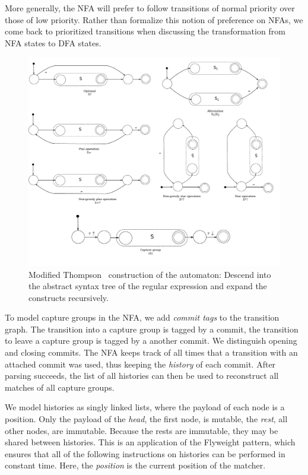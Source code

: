 \documentclass[11pt]{Thesis}
\theoremstyle{definition}
\begin{document}
More generally, the NFA will prefer to follow transitions of normal
priority over those of low priority. Rather than formalize this
notion of preference on NFAs, we come back to prioritized transitions when
discussing the transformation from NFA states to DFA states.

\begin{figure}[tb] \includegraphics[width=\linewidth]{graphs/thompson}
  \caption[Modified Thompson construction]{Modified Thompson~\cite{Thom68a} construction of the
automaton: Descend into the abstract syntax tree of the regular
expression and expand the constructs recursively.}
\label{fig:thompson-construction} 
\end{figure}

To model capture groups in the NFA, we add \emph{commit tags} to
the transition graph. The transition into a capture group is tagged
by a commit, the transition to leave a capture group is tagged by
a another commit. We distinguish opening and closing commits. The
NFA keeps track of all times that a transition with an attached
commit was used, thus keeping the \emph{history} of each commit.
After parsing succeeds, the list of all histories can then be used
to reconstruct all matches of all capture groups.

We model histories as singly linked lists, where the payload of each node is a
position.  Only the payload of the \emph{head}, the first node, is mutable, the
\emph{rest}, all other nodes, are immutable.  Because the rests are immutable,
they may be shared between histories.  This is an application of the Flyweight
pattern, which ensures that all of the following instructions on histories can
be performed in constant time. Here, the \emph{position} is the current
position of the matcher.
\end{document}
